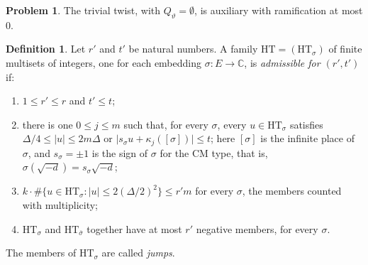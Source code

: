 \documentclass[reqno]{amsart}
\theoremstyle{definition}
\newtheorem{problem}{Problem}[section]
\newtheorem{definition}{Definition}[section]
\theoremstyle{plain}
\newcommand{\C}{\mathbb{C}}
\newcommand{\HT}{\mathrm{HT}}
\begin{document}
\begin{problem}\label{pr:trivial-aux}
The trivial twist, with \(Q_\vartheta = \emptyset\), is auxiliary with ramification at most \(0\).
\end{problem}

\begin{definition}\label{def:jumps}
Let \(r'\) and \(t'\) be natural numbers.  A family \(\HT = (\HT_\sigma)\) of finite multisets of integers, one for each embedding \(\sigma \colon E \to \C\), is \emph{admissible for \((r', t')\)} if:
\begin{enumerate}
\item[(i)] \(1 \le r' \le r\) and \(t' \le t\);
\item[(ii)] there is one \(0 \le j \le m\) such that, for every \(\sigma\), every \(u \in \HT_\sigma\) satisfies \(\Delta/4 \le \lvert u\rvert \le 2m\Delta\) or \(\lvert s_\sigma u + \kappa_j([\sigma])\rvert \le t\); here \([\sigma]\) is the infinite place of \(\sigma\), and \(s_\sigma = \pm 1\) is the sign of \(\sigma\) for the CM type, that is, \(\sigma(\sqrt{-d}) = s_\sigma\sqrt{-d}\);
\item[(iii)] \(k \cdot \#\{u \in \HT_\sigma : \lvert u\rvert \le 2(\Delta/2)^2\} \le r'm\) for every \(\sigma\), the members counted with multiplicity;
\item[(iv)] \(\HT_\sigma\) and \(\HT_{\bar\sigma}\) together have at most \(r'\) negative members, for every \(\sigma\).
\end{enumerate}
The members of \(\HT_\sigma\) are called \emph{jumps}.
\end{definition}
\end{document}
